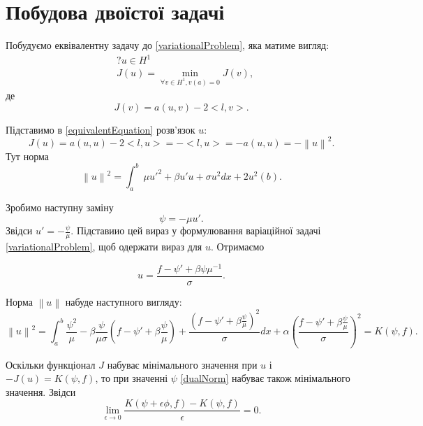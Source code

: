 \documentclass[a4paper]{article}
\newcommand\norm[1]{\left\lVert#1\right\rVert}
\numberwithin{equation}{section}
\begin{document}
\section{Побудова двоїстої задачі}
Побудуємо еквівалентну задачу до \ref{variationalProblem}, яка матиме вигляд:
\begin{equation}\label{equivalentProblem}
\begin{split}
& ? u \in H^1
\\ & J(u) = \min_{ \forall v \in H^1, v(a)=0}J(v),
\end{split}
\end{equation}
де
\begin{equation}\label{equivalentEquation}
J(v) = a(u,v) - 2<l,v>.
\end{equation}

Підставимо в \ref{equivalentEquation} розв'язок $u$:
\begin{equation}
J(u) = a(u,u) - 2<l,u> = -<l,u> = -a(u,u) = -\norm{u}^2.
\end{equation}
Тут норма \begin{equation}
\norm{u} ^ 2 = \int_a^b\ \mu u'^2 + \beta u' u + \sigma u ^ 2dx + 2u^2(b).
\end{equation} 

Зробимо наступну заміну
\begin{equation}\label{replacement}
\psi = -\mu u'.
\end{equation}
Звідси $ u' = - \frac{ \psi } { \mu }$. Підставиио цей вираз у формулювання варіаційної задачі \ref{variationalProblem}, щоб одержати вираз для $ u $. Отримаємо

\begin{equation}
u = \frac {f - \psi' + \beta \psi \mu ^{-1} } {\sigma}.
\end{equation}

Норма $\norm{u}$ набуде наступного вигляду:
\begin{equation} \label{dualNorm}
\norm{u}^2 = \int_a^b \frac{\psi^2} {\mu} - \beta \frac {\psi} {\mu \sigma} (f - \psi' + \beta \frac {\psi} {\mu}) + \frac {(f - \psi' + \beta \frac {\psi} {\mu})^2} {\sigma} dx + \alpha (\frac {f - \psi' + \beta \frac {\psi} {\mu}} {\sigma})^2 = K(\psi, f).
\end{equation}

Оскільки функціонал $J$ набуває мінімального значення при $u$ і $-J(u) = K(\psi, f)$, то при значенні $\psi$ \ref{dualNorm} набуває також мінімального значення. Звідси 
\begin{equation} \label{dualNormLimit}
\lim_{\epsilon \to 0} \frac {K(\psi + \epsilon \phi, f) - K(\psi, f)} {\epsilon} = 0.
\end{equation}
\end{document}
